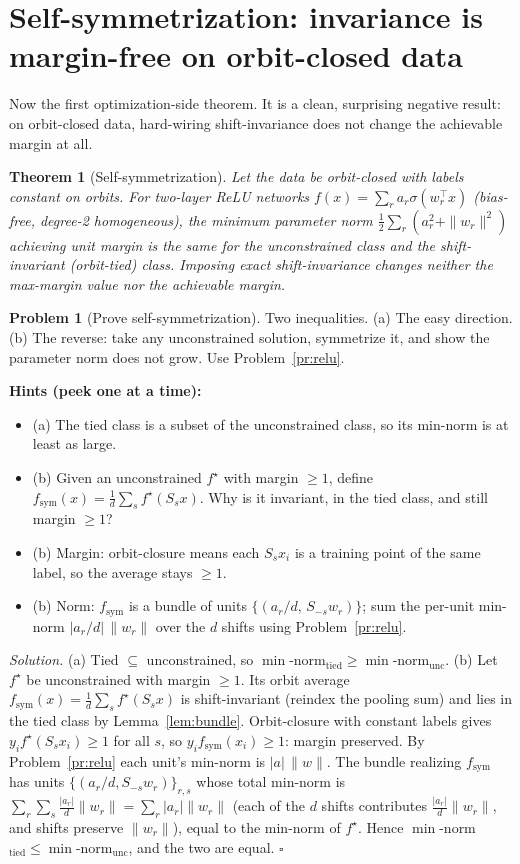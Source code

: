 \documentclass[11pt]{article}
\theoremstyle{plain}
\newtheorem{theorem}{Theorem}[section]
\theoremstyle{definition}
\newtheorem{problem}{Problem}[section]
\theoremstyle{remark}
\newenvironment{hints}{\par\smallskip\noindent\textbf{\color{hintc}Hints (peek one at a time):}\begin{itemize}}{\end{itemize}\par\smallskip}
\newenvironment{solution}{\par\smallskip\noindent\textit{Solution.}\;}{\hfill$\square$\par\smallskip}
\begin{document}
\section{Self-symmetrization: invariance is margin-free on orbit-closed data}\label{sec:selfsym}

Now the first optimization-side theorem. It is a clean, surprising negative result: on orbit-closed data, hard-wiring
shift-invariance does not change the achievable margin at all.

\begin{theorem}[Self-symmetrization]\label{thm:selfsym}
Let the data be orbit-closed with labels constant on orbits. For two-layer ReLU networks
$f(x)=\sum_r a_r\sigma(w_r^\top x)$ (bias-free, degree-2 homogeneous), the minimum parameter norm
$\tfrac12\sum_r(a_r^2+\|w_r\|^2)$ achieving unit margin is the same for the unconstrained class and the
shift-invariant (orbit-tied) class. Imposing exact shift-invariance changes neither the max-margin value nor the
achievable margin.
\end{theorem}

\begin{problem}[Prove self-symmetrization]\label{pr:selfsym}
Two inequalities. (a) The easy direction. (b) The reverse: take any unconstrained solution, symmetrize it, and show
the parameter norm does not grow. Use Problem~\ref{pr:relu}.
\end{problem}
\begin{hints}
\item (a) The tied class is a subset of the unconstrained class, so its min-norm is at least as large.
\item (b) Given an unconstrained $f^\star$ with margin $\ge1$, define $f_{\mathrm{sym}}(x)=\frac1d\sum_s f^\star(S_sx)$. Why is it invariant, in the tied class, and still margin $\ge1$?
\item (b) Margin: orbit-closure means each $S_sx_i$ is a training point of the same label, so the average stays $\ge1$.
\item (b) Norm: $f_{\mathrm{sym}}$ is a bundle of units $\{(a_r/d,\,S_{-s}w_r)\}$; sum the per-unit min-norm $|a_r/d|\,\|w_r\|$ over the $d$ shifts using Problem~\ref{pr:relu}.
\end{hints}
\begin{solution}
(a) Tied $\subseteq$ unconstrained, so $\min$-norm$_{\mathrm{tied}}\ge\min$-norm$_{\mathrm{unc}}$. (b) Let $f^\star$ be
unconstrained with margin $\ge1$. Its orbit average $f_{\mathrm{sym}}(x)=\frac1d\sum_s f^\star(S_sx)$ is
shift-invariant (reindex the pooling sum) and lies in the tied class by Lemma~\ref{lem:bundle}. Orbit-closure with
constant labels gives $y_if^\star(S_sx_i)\ge1$ for all $s$, so $y_if_{\mathrm{sym}}(x_i)\ge1$: margin preserved. By
Problem~\ref{pr:relu} each unit's min-norm is $|a|\,\|w\|$. The bundle realizing $f_{\mathrm{sym}}$ has units
$\{(a_r/d,S_{-s}w_r)\}_{r,s}$ whose total min-norm is $\sum_r\sum_s \frac{|a_r|}{d}\|w_r\|=\sum_r|a_r|\|w_r\|$
(each of the $d$ shifts contributes $\frac{|a_r|}{d}\|w_r\|$, and shifts preserve $\|w_r\|$), equal to the min-norm of
$f^\star$. Hence
$\min$-norm$_{\mathrm{tied}}\le\min$-norm$_{\mathrm{unc}}$, and the two are equal.
\end{solution}
\end{document}
